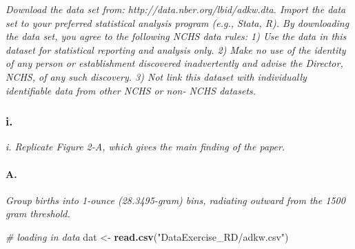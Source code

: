 \documentclass[
]{article}
\newenvironment{Shaded}{\begin{snugshade}}{\end{snugshade}}
\newcommand{\CommentTok}[1]{\textcolor[rgb]{0.56,0.35,0.01}{\textit{#1}}}
\newcommand{\DataTypeTok}[1]{\textcolor[rgb]{0.13,0.29,0.53}{#1}}
\newcommand{\DecValTok}[1]{\textcolor[rgb]{0.00,0.00,0.81}{#1}}
\newcommand{\FloatTok}[1]{\textcolor[rgb]{0.00,0.00,0.81}{#1}}
\newcommand{\KeywordTok}[1]{\textcolor[rgb]{0.13,0.29,0.53}{\textbf{#1}}}
\newcommand{\NormalTok}[1]{#1}
\newcommand{\OperatorTok}[1]{\textcolor[rgb]{0.81,0.36,0.00}{\textbf{#1}}}
\newcommand{\OtherTok}[1]{\textcolor[rgb]{0.56,0.35,0.01}{#1}}
\newcommand{\StringTok}[1]{\textcolor[rgb]{0.31,0.60,0.02}{#1}}
\begin{document}
\textit{Download the data set from: http://data.nber.org/lbid/adkw.dta. Import the data set to your preferred statistical analysis program (e.g., Stata, R). By downloading the data set, you agree to the following NCHS data rules: 1) Use the data in this dataset for statistical reporting and analysis only. 2) Make no use of the identity of any person or establishment discovered inadvertently and advise the Director, NCHS, of any such discovery. 3) Not link this dataset with individually identifiable data from other NCHS or non- NCHS datasets.}

\hypertarget{i.}{%
\subsubsection{i.}\label{i.}}

\textit{i. Replicate Figure 2-A, which gives the main finding of the paper.}

\hypertarget{a.-1}{%
\paragraph{A.}\label{a.-1}}

\textit{Group births into 1-ounce (28.3495-gram) bins, radiating outward from the 1500 gram threshold.}

\begin{Shaded}
\begin{Highlighting}[]
\CommentTok{# loading in data}
\NormalTok{dat <-}\StringTok{ }\KeywordTok{read.csv}\NormalTok{(}\StringTok{"DataExercise_RD/adkw.csv"}\NormalTok{)}
\end{Highlighting}
\end{Shaded}

\begin{Shaded}
\end{Shaded}
\end{document}
